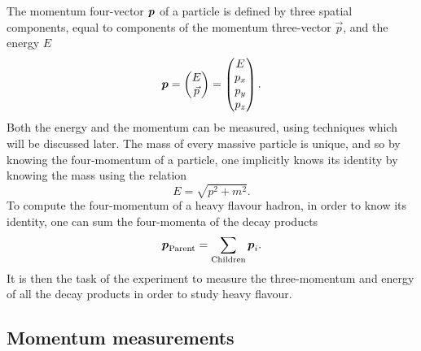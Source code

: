 The momentum four-vector $\boldsymbol{p}$ of a particle is defined by three spatial 
components, equal to components of the momentum three-vector $\vec{p}$, and the 
energy $E$
\begin{equation}
  \boldsymbol{p} = \begin{pmatrix}E\\\vec{p}\end{pmatrix}
           = \begin{pmatrix}E\\p_{x}\\p_{y}\\p_{z}\end{pmatrix}.
  \label{intro:lhcb:four_momentum}
\end{equation}
Both the energy and the momentum can be measured, using techniques which will 
be discussed later.
The mass of every massive particle is unique, and so by knowing the 
four-momentum of a particle, one implicitly knows its identity by knowing the 
mass using the relation
\begin{equation}
  E = \sqrt{p^{2} + m^{2}}.
  \label{intro:lhcb:energy}
\end{equation}
To compute the four-momentum of a heavy flavour hadron, in order to know its 
identity, one can sum the four-momenta of the decay products
\begin{equation}
  \boldsymbol{p}_{\text{Parent}} = \sum_{\text{Children}} \boldsymbol{p}_{i}.
  \label{intro:lhcb:four_momentum_sum}
\end{equation}
It is then the task of the experiment to measure the three-momentum and energy 
of all the decay products in order to study heavy flavour.

\subsection{Momentum measurements}

